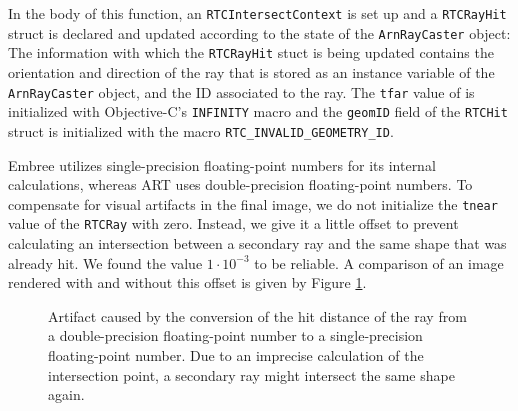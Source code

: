 In the body of this function, an \texttt{RTCIntersectContext} is set up and a \texttt{RTCRayHit} struct is declared and updated according to the state of the \texttt{ArnRayCaster} object: The information with which the \texttt{RTCRayHit} stuct is being updated contains the orientation and direction of the ray that is stored as an instance variable of the \texttt{ArnRayCaster} object, and the ID associated to the ray. The \texttt{tfar} value of is initialized with Objective-C's \texttt{INFINITY} macro and the \texttt{geomID} field of the \texttt{RTCHit} struct is initialized with the macro \texttt{RTC\_INVALID\_GEOMETRY\_ID}. 

Embree utilizes single-precision floating-point numbers for its internal calculations, whereas ART uses double-precision floating-point numbers. To compensate for visual artifacts in the final image, we do not initialize the \texttt{tnear} value of the \texttt{RTCRay} with zero. Instead, we give it a little offset to prevent calculating an intersection between a secondary ray and the same shape that was already hit. We found the value $1\cdot 10^{-3}$ to be reliable. A comparison of an image rendered with and without this offset is given by Figure \ref{fig:offset}.

\begin{figure}[!tbp]
	\centering
	\hfil
	\caption{Artifact caused by the conversion of the hit distance of the ray from a double-precision floating-point number to a single-precision floating-point number. Due to an imprecise calculation of the intersection point, a secondary ray might intersect the same shape again.}
	\label{fig:offset}
\end{figure}

